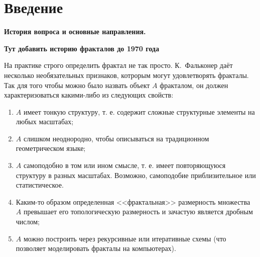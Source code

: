 \chapter*{Введение}                         %



\begin{center}
\textbf{История вопроса и основные направления.}
\end{center}
{\bf Тут добавить историю фракталов до 1970 года}


На практике строго определить фрактал не так просто.
К.~Фальконер \cite{Falconer2004} даёт несколько необязательных признаков, котрорым могут удовлетворять фракталы.
Так для того чтобы можно было назвать объект $A$ фракталом, он должен характеризоваться какими-либо из следующих свойств:

\begin{enumerate}
\item $A$ имеет тонкую структуру, т. е. содержит сложные структурные элементы на любых масштабах;
\item $A$ слишком неоднородно, чтобы описываться на традиционном геометрическом языке;
\item $A$ самоподобно в том или ином смысле, т. е. имеет повторяющуюся структуру в разных масштабах. Возможно, самоподобие приблизительное или статистическое.
\item Каким-то образом определенная <<фрактальная>> размерность множества $A$ превышает его топологическую размерность и зачастую является дробным числом;
\item $A$ можно построить через рекурсивные или итеративные схемы (что позволяет моделировать фракталы на компьютерах).
\end{enumerate}


